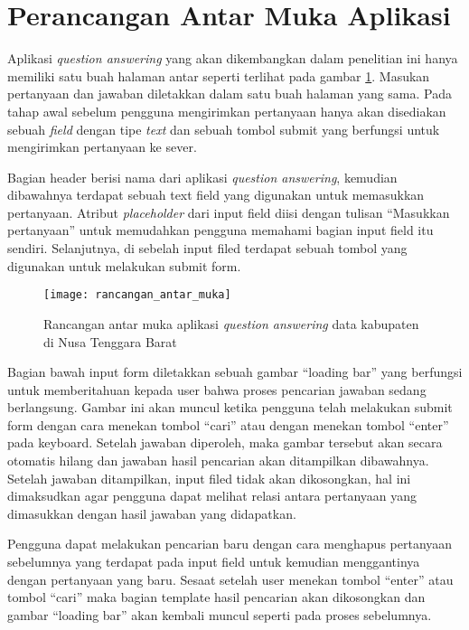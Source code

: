 \section{Perancangan Antar Muka Aplikasi}
Aplikasi \emph{question answering} yang akan dikembangkan dalam penelitian ini hanya memiliki satu buah halaman antar seperti terlihat pada gambar \ref{fig:rancangan_antarmuka}. Masukan pertanyaan dan jawaban diletakkan dalam satu buah halaman yang sama. Pada tahap awal sebelum pengguna mengirimkan pertanyaan hanya akan disediakan sebuah \emph{field} dengan tipe \emph{text} dan sebuah tombol submit yang berfungsi untuk mengirimkan pertanyaan ke sever.

Bagian header berisi nama dari aplikasi \emph{question answering}, kemudian dibawahnya terdapat sebuah text field yang digunakan untuk memasukkan pertanyaan. Atribut \emph{placeholder} dari input field diisi dengan tulisan ``Masukkan pertanyaan'' untuk memudahkan pengguna memahami bagian input field itu sendiri. Selanjutnya, di sebelah input filed terdapat sebuah tombol yang digunakan untuk melakukan submit form.

\begin{figure}[ht]
    \centering
    \texttt{[image: rancangan\_antar\_muka]}
    \caption{Rancangan antar muka aplikasi \emph{question answering} data kabupaten di Nusa Tenggara Barat}
    \label{fig:rancangan_antarmuka}
\end{figure}

Bagian bawah input form diletakkan sebuah gambar ``loading bar'' yang berfungsi untuk memberitahuan kepada user bahwa proses pencarian jawaban sedang berlangsung. Gambar ini akan muncul ketika pengguna telah melakukan submit form dengan cara menekan tombol ``cari'' atau dengan menekan tombol ``enter'' pada keyboard. Setelah jawaban diperoleh, maka gambar tersebut akan secara otomatis hilang dan jawaban hasil pencarian akan ditampilkan dibawahnya. Setelah jawaban ditampilkan, input filed tidak akan dikosongkan, hal ini dimaksudkan agar pengguna dapat melihat relasi antara pertanyaan yang dimasukkan dengan hasil jawaban yang didapatkan.

Pengguna dapat melakukan pencarian baru dengan cara menghapus pertanyaan sebelumnya yang terdapat pada input field untuk kemudian menggantinya dengan pertanyaan yang baru. Sesaat setelah user menekan tombol ``enter'' atau tombol ``cari'' maka bagian template hasil pencarian akan dikosongkan dan gambar ``loading bar'' akan kembali muncul seperti pada proses sebelumnya.